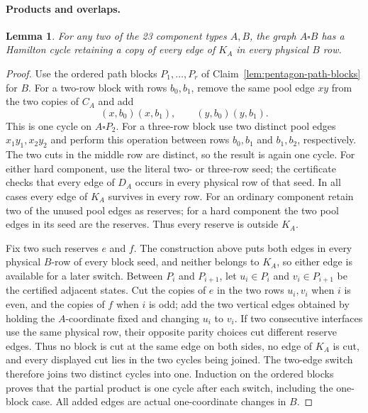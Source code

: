 \documentclass[11pt]{article}
\newtheorem{lemma}[theorem]{Lemma}
\theoremstyle{remark}
\numberwithin{equation}{section}
\numberwithin{table}{section}
\begin{document}
\paragraph{Products and overlaps.}
\begin{lemma}\label{lem:protected-product}
For any two of the 23 component types $A,B$, the graph $A\square B$
has a Hamilton cycle retaining a copy of every edge of $K_A$
in every physical $B$ row.
\end{lemma}
\begin{proof}
Use the ordered path blocks $P_1,\ldots,P_r$ of
Claim~\ref{lem:pentagon-path-blocks} for $B$.  For a two-row block
with rows $b_0,b_1$, remove the same pool edge $xy$ from the two
copies of $C_A$ and add
\[
 (x,b_0)(x,b_1),\qquad (y,b_0)(y,b_1).
\]
This is one cycle on $A\square P_2$.  For a three-row block use two
distinct pool edges $x_1y_1,x_2y_2$ and perform this operation between
rows $b_0,b_1$ and $b_1,b_2$, respectively.  The two cuts in the
middle row are distinct, so the result is again one cycle.  For either
hard component, use the literal two- or three-row seed; the
certificate checks that every edge of $D_A$ occurs in every physical
row of that seed.  In all cases every edge of $K_A$ survives in every
row.  For an ordinary component retain two of the unused pool edges
as reserves; for a hard component the two pool edges in its seed are
the reserves.  Thus every reserve is outside $K_A$.

Fix two such reserves $e$ and $f$.  The construction above puts both
edges in every physical $B$-row of every block seed, and neither belongs to
$K_A$, so either
edge is available for a later switch.  Between $P_i$ and $P_{i+1}$,
let $u_i\in P_i$ and $v_i\in P_{i+1}$ be the certified adjacent
states.  Cut the copies of $e$ in the two rows $u_i,v_i$ when $i$ is
even, and the copies of $f$ when $i$ is odd; add the two vertical
edges obtained by holding the $A$-coordinate fixed and changing
$u_i$ to $v_i$.  If two consecutive interfaces use the same physical
row, their opposite parity choices cut different reserve edges.  Thus
no block is cut at the same edge on both sides, no edge of $K_A$ is
cut, and every displayed cut lies in the two cycles being joined.
The two-edge switch therefore joins two distinct cycles into one.  Induction
on the ordered blocks proves that the partial product is one cycle after
each switch, including the one-block case.  All added edges are actual
one-coordinate changes in $B$.
\end{proof}
\end{document}
